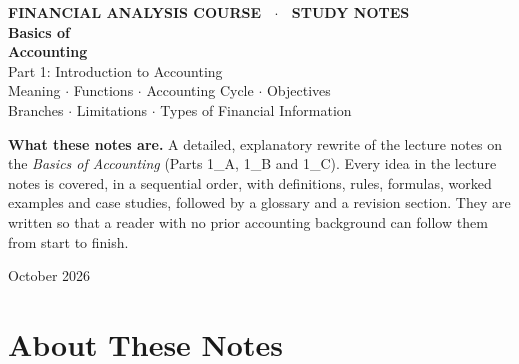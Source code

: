 \documentclass[11pt,a4paper]{article}
\begin{document}
\begin{titlepage}
\thispagestyle{empty}
\vspace*{1.6cm}
{\color{white}\sffamily
{\large\bfseries FINANCIAL ANALYSIS COURSE \ $\cdot$ \ STUDY NOTES}\\[1.4cm]
{\fontsize{36}{42}\selectfont\bfseries Basics of\\[2pt]Accounting}\\[0.7cm]
{\fontsize{20}{24}\selectfont Part 1: Introduction to Accounting}\\[0.7cm]
{\large Meaning $\cdot$ Functions $\cdot$ Accounting Cycle $\cdot$ Objectives\\
Branches $\cdot$ Limitations $\cdot$ Types of Financial Information}}
\vfill
{\sffamily
\begin{tcolorbox}[enhanced,colback=white,colframe=acnavy!40,boxrule=0.5pt,arc=3pt]
\textbf{What these notes are.} A detailed, explanatory rewrite of the lecture notes on the
\emph{Basics of Accounting} (Parts 1\_A, 1\_B and 1\_C). Every idea in the lecture notes is
covered, in a sequential order, with definitions, rules, formulas, worked examples and
case studies, followed by a glossary and a revision section. They are written so that
a reader with no prior accounting background can follow them from start to finish.
\end{tcolorbox}}
\vspace{0.6cm}
\begin{center}\sffamily\color{gray} October 2026\end{center}
\end{titlepage}

\section*{About These Notes}
\end{document}
